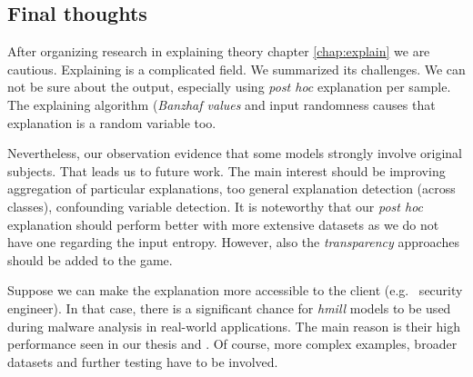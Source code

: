 \subsection{Final thoughts}
After organizing research in explaining theory chapter \ref{chap:explain} we are cautious. Explaining is a complicated field. We summarized its challenges. We can not be sure about the output, especially using \emph{post hoc} explanation per sample. The explaining algorithm (\emph{Banzhaf values} and  input randomness causes that explanation is a random variable too. 

Nevertheless, our observation evidence that some models strongly involve original subjects. That leads us to future work. The main interest should be improving aggregation of particular explanations, too general explanation detection (across classes), confounding variable detection. It is noteworthy that our \emph{post hoc} explanation should perform better with more extensive datasets as we do not have one regarding the input entropy. However, also the \emph{transparency} approaches should be added to the game. 

Suppose we can make the explanation more accessible to the client (e.g. \ security engineer). In that case, there is a significant chance for \emph{hmill} models to be used during malware analysis in real-world applications. The main reason is their high performance seen in our thesis and \cite{Mandlik2020} . Of course, more complex examples, broader datasets and further testing have to be involved.


